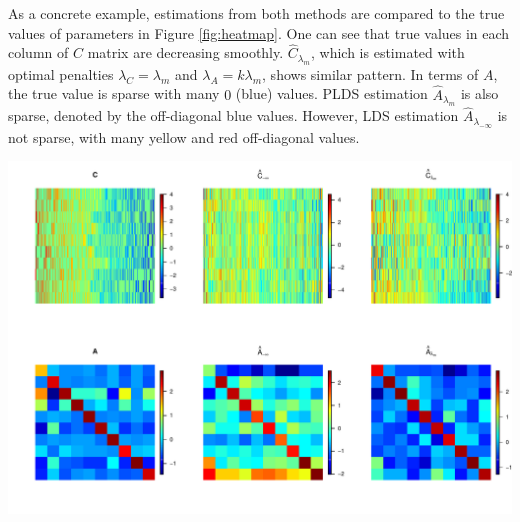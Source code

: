 \documentclass[fleqn]{article}
\let\oldref\ref
\renewcommand{\ref}[1]{(\oldref{#1})}
\begin{document}
As a concrete example, estimations from both methods are compared to the true values of parameters in Figure \oldref{fig:heatmap}. One can see that true values in each column of $C$ matrix are decreasing smoothly. $\hat{C}_{\lambda_m}$, which is estimated with optimal penalties $\lambda_C = \lambda_m$ and $\lambda_A = k\lambda_m$, shows similar pattern. In terms of $A$, the true value is sparse with many $0$ (blue) values. PLDS estimation $\hat{A}_{\lambda_m}$ is also sparse, denoted by the off-diagonal blue values. However, LDS estimation $\hat{A}_{\lambda_{-\infty}}$ is not sparse, with many yellow and red off-diagonal values.
\begin{center}
 \includegraphics[scale=.6]{./figures/heatmap-figure-1}
 \label{fig:heatmap}
\end{center}



\end{document}
